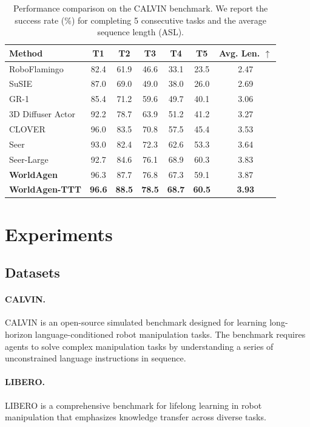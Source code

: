 \begin{table}[!t]
\centering
\small
\setlength{\tabcolsep}{4pt}
\begin{tabular}{l|ccccc|c}
\toprule
Method & T1 & T2 & T3 & T4 & T5 & Avg. Len. $\uparrow$ \\
\midrule
RoboFlamingo      & 82.4 & 61.9 & 46.6 & 33.1 & 23.5 & 2.47 \\
SuSIE             & 87.0 & 69.0 & 49.0 & 38.0 & 26.0 & 2.69 \\
GR-1              & 85.4 & 71.2 & 59.6 & 49.7 & 40.1 & 3.06 \\
3D Diffuser Actor & 92.2 & 78.7 & 63.9 & 51.2 & 41.2 & 3.27 \\
CLOVER            & 96.0 & 83.5 & 70.8 & 57.5 & 45.4 & 3.53 \\
Seer              & 93.0 & 82.4 & 72.3 & 62.6 & 53.3 & 3.64 \\
Seer-Large        & 92.7 & 84.6 & 76.1 & 68.9 & 60.3 & 3.83 \\
\midrule
\textbf{WorldAgen}        & 96.3 & 87.7 & 76.8 & 67.3 & 59.1 & 3.87 \\
\textbf{WorldAgen-TTT}    & \textbf{96.6} & \textbf{88.5} & \textbf{78.5} & \textbf{68.7} & \textbf{60.5} & \textbf{3.93} \\
\bottomrule
\end{tabular}
\caption{Performance comparison on the CALVIN benchmark.
We report the success rate (\%) for completing 5 consecutive tasks 
and the average sequence length (ASL).}
\label{tab:calvin_results}
\end{table}


\section{Experiments}

\subsection{Datasets}
\paragraph{CALVIN.} CALVIN \citep{mees2022calvin} is an open-source simulated benchmark designed for learning long-horizon language-conditioned robot manipulation tasks. The benchmark requires agents to solve complex manipulation tasks by understanding a series of unconstrained language instructions in sequence.

\paragraph{LIBERO.} LIBERO \citep{liu2023libero} is a comprehensive benchmark for lifelong learning in robot manipulation that emphasizes knowledge transfer across diverse tasks.

